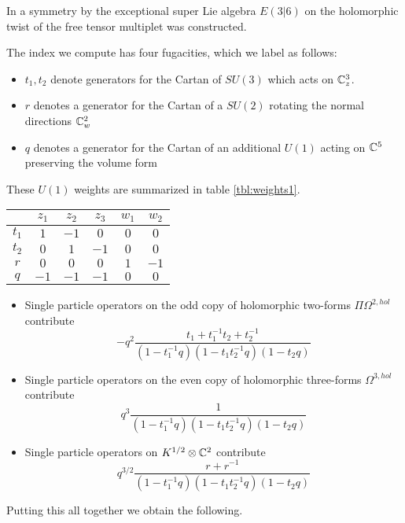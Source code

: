 \documentclass[11pt]{amsart}
\begin{document}
\parsec

In \cite{SW6d} a symmetry by the exceptional super Lie algebra $E(3|6)$ on the holomorphic twist of the free tensor multiplet was constructed.

\parsec

The index we compute has four fugacities, which we label as follows:
\begin{itemize}
  \item $t_{1}, t_{2}$ denote generators for the Cartan of $SU(3)$ which acts on $\mathbb{C}^{3}_{z}$.
  \item $r$ denotes a generator for the Cartan of a $SU(2)$ rotating the normal directions $\mathbb{C}^{2}_{w}$
  \item $q$ denotes a generator for the Cartan of an additional $U(1)$ acting on $\mathbb{C}^{5}$ preserving the volume form
\end{itemize}
These $U(1)$ weights are summarized in table \ref{tbl:weights1}.

\begin{center}
\begin{tabular}{c c c c c c}
  & $z_{1}$ & $z_{2}$ & $z_{3}$ & $w_{1}$ & $w_{2}$ \\
  \hline
  $t_{1}$ & $1$ & $-1$ & $0$ & $0$ & $0$ \\
  $t_{2}$ & $0$ & $1$ & $-1$ & $0$ & $0$ \\
  $r$ & $0$ & $0$ & $0$ & $1$ & $-1$ \\
  $q$ & $-1$ & $-1$ & $-1$ & $0$ & $0$
\end{tabular}
\end{center}

\parsec

\begin{itemize}
\item Single particle operators on the odd copy of holomorphic two-forms $\Pi \Omega^{2,hol}$ contribute
\[
- q^2 \frac{t_1  + t_1^{-1} t_2  + t_2^{-1} }{(1-t_1^{-1}q) (1-t_1 t_2^{-1} q) (1-t_2 q)} 
\]
\item Single particle operators on the even copy of holomorphic three-forms $\Omega^{3,hol}$ contribute
\[
q^3 \frac{1}{(1-t_1^{-1}q) (1-t_1 t_2^{-1} q) (1-t_2 q)} 
\]
\item Single particle operators on $K^{1/2} \otimes \mathbb{C}^2$ contribute
\[
q^{3/2}\frac{r + r^{-1}}{(1-t_1^{-1}q) (1-t_1 t_2^{-1} q) (1-t_2 q)}
\]
\end{itemize}

Putting this all together we obtain the following.
\end{document}
